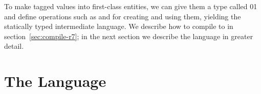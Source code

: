 \documentclass[7x10]{TimesAPriori_MIT}%
\def\racketEd{0}
\def\pythonEd{1}
\def\edition{1}
\newcommand{\racket}[1]{{\if\edition\racketEd{#1}\fi}}
\newcommand{\pythonColor}[0]{}
\newcommand{\python}[1]{{\if\edition\pythonEd\pythonColor #1\fi}}
\numberwithin{theorem}{chapter}
\numberwithin{definition}{chapter}
\numberwithin{equation}{chapter}
\begin{document}
To make tagged values into first-class entities, we can give them a
type called \racket{}\python{} and define
operations such as  and  for creating and
using them, yielding the statically typed \LangAny{} intermediate
language. We describe how to compile \LangDyn{} to \LangAny{} in
section~\ref{sec:compile-r7}; in the next section we describe the
\LangAny{} language in greater detail.

\section{The \LangAny{} Language}
\label{sec:Rany-lang}

\newcommand{\LanyASTRacket}{
\begin{array}{lcl}
\Type &::= & \ANYTY \\
\FType &::=& \key{Integer} \MID \key{Boolean} \MID \key{Void} 
      \MID \LP\key{Vector}\; \ANYTY\ldots\RP 
      \MID \LP\ANYTY\ldots \; \key{->}\; \ANYTY\RP\\
\itm{op} &::= & \code{any-vector-length}
     \MID \code{any-vector-ref} \MID \code{any-vector-set!}\\
    &\MID& \code{boolean?} \MID \code{integer?} \MID \code{vector?}
     \MID \code{procedure?} \MID \code{void?} \\
  \Exp &::=& \INJECT{\Exp}{\FType} \MID \PROJECT{\Exp}{\FType} 
\end{array}
}

\newcommand{\LanyASTPython}{
\begin{array}{lcl}
\Type &::= & \key{AnyType()} \\
\FType &::=& \key{IntType()} \MID \key{BoolType()} \MID \key{VoidType()}
  \MID \key{TupleType}\LS\key{AnyType()}^+\RS \\
  &\MID& \key{FunctionType}\LP \key{AnyType()}^{*}\key{, }\key{AnyType()}\RP \\
\Exp & ::= & \INJECT{\Exp}{\FType} \MID \PROJECT{\Exp}{\FType} \\
     &\MID& \CALL{\VAR{\key{'any\_tuple\_load'}}}{\LS\Exp\key{, }\Exp\RS}\\
     &\MID& \CALL{\VAR{\key{'any\_len'}}}{\LS\Exp\RS} \\
     &\MID& \CALL{\VAR{\key{'arity'}}}{\LS\Exp\RS}  \\
     &\MID& \CALL{\VAR{\key{'make\_any'}}}{\LS\Exp\key{, }\INT{\Int}\RS} 
\end{array}
}
\end{document}
